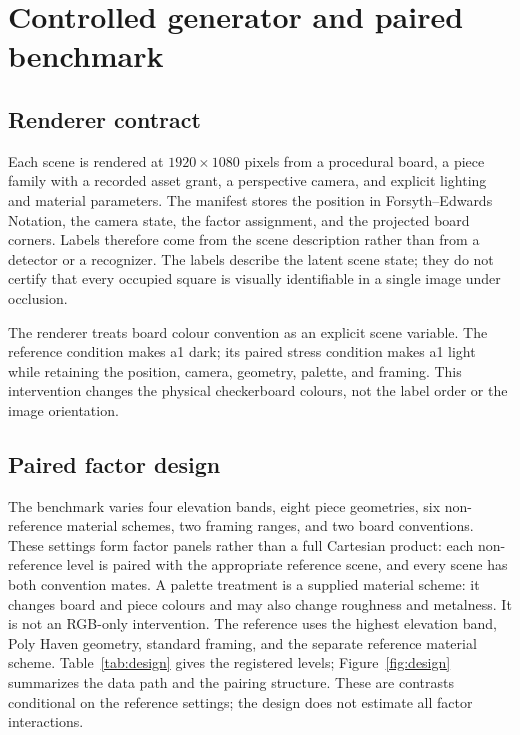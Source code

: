 \section{Controlled generator and paired benchmark}
\label{sec:benchmark}

\subsection{Renderer contract}

Each scene is rendered at $1920\times1080$ pixels from a procedural board, a
piece family with a recorded asset grant, a perspective camera, and explicit lighting and material
parameters. The manifest stores the position in Forsyth--Edwards Notation, the
camera state, the factor assignment, and the projected board corners. Labels
therefore come from the scene description rather than from a detector or a
recognizer. The labels describe the latent scene state; they do not certify that
every occupied square is visually identifiable in a single image under occlusion.

The renderer treats board colour convention as an explicit scene variable.
The reference condition makes a1 dark; its paired stress condition makes a1
light while retaining the position, camera, geometry, palette, and framing.
This intervention changes the physical checkerboard colours, not the label
order or the image orientation.

\subsection{Paired factor design}

The benchmark varies four elevation bands, eight piece geometries, six non-reference
material schemes, two framing ranges, and two board conventions. These settings form
factor panels rather than a full Cartesian product: each non-reference level is
paired with the appropriate reference scene, and every scene has both convention
mates. A palette treatment is a supplied material scheme: it changes board and
piece colours and may also change roughness and metalness. It is not an RGB-only
intervention. The reference uses the highest elevation band, Poly Haven geometry,
standard framing, and the separate reference material scheme. Table~\ref{tab:design} gives the registered levels; Figure~\ref{fig:design}
summarizes the data path and the pairing structure. These are contrasts conditional
on the reference settings; the design does not estimate all factor interactions.

